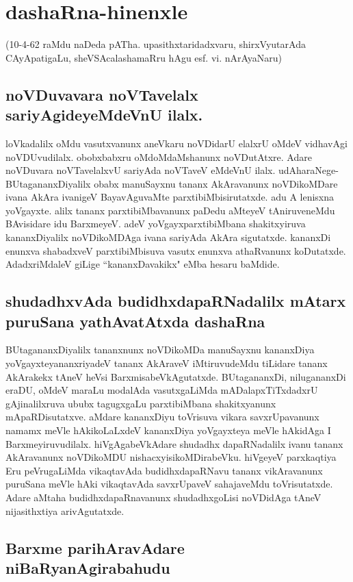 \chapter{dashaRna-hinenxle}

(10-4-62 raMdu naDeda pATha. upasithxtaridadxvaru, shirxVyutarAda CAyApatigaLu, sheVSAcalashamaRru hAgu esf. vi. nArAyaNaru)

\section*{noVDuvavara noVTavelalx sariyAgideyeMdeVnU ilalx.}

loVkadalilx oMdu vasutxvanunx aneVkaru noVDidarU elalxrU oMdeV vidhavAgi noVDUvudilalx. obobxbabxru oMdoMdaMshanunx noVDutAtxre. Adare noVDuvara noVTavelalxvU sariyAda noVTaveV eMdeVnU ilalx. udAharaNege-BUtagananxDiyalilx obabx manuSayxnu tananx AkAravanunx noVDikoMDare ivana AkAra ivanigeV BayavAguvaMte parxtibiMbisirutatxde. adu A lenisxna yoVgayxte. alilx tananx parxtibiMbavanunx paDedu aMteyeV tAniruveneMdu BAvisidare idu BarxmeyeV. adeV yoVgayxparxtibiMbana shakitxyiruva kananxDiyalilx noVDikoMDAga ivana sariyAda AkAra sigutatxde. kananxDi enunxva shabadxveV parxtibiMbisuva vasutx enunxva athaRvanunx koDutatxde. AdadxriMdaleV giLige ``kananxDavakikx" eMba hesaru baMdide.

\section*{shudadhxvAda budidhxdapaRNadalilx mAtarx puruSana yathAvatAtxda dashaRna}

BUtagananxDiyalilx tananxnunx noVDikoMDa manuSayxnu kananxDiya yoVgayxteyananxriyadeV tananx AkAraveV iMtiruvudeMdu tiLidare tananx AkArakekx tAneV heVsi BarxmisabeVkAgutatxde. BUtagananxDi, nilugananxDi eraDU, oMdeV maraLu modalAda vasutxgaLiMda mADalapxTiTxdadxrU gAjinalilxruva ububx tagugxgaLu parxtibiMbana shakitxyanunx mApaRDisutatxve. aMdare kananxDiyu toVrisuva vikara savxrUpavanunx namamx meVle hAkikoLaLxdeV kananxDiya yoVgayxteya meVle hAkidAga I Barxmeyiruvudilalx. hiVgAgabeVkAdare shudadhx dapaRNadalilx ivanu tananx AkAravanunx noVDikoMDU nishacxyisikoMDirabeVku. hiVgeyeV parxkaqtiya Eru peVrugaLiMda vikaqtavAda budidhxdapaRNavu tananx vikAravanunx puruSana meVle hAki vikaqtavAda savxrUpaveV sahajaveMdu toVrisutatxde. Adare aMtaha budidhxdapaRnavanunx shudadhxgoLisi noVDidAga tAneV nijasithxtiya arivAgutatxde.

\section*{Barxme parihAravAdare niBaRyanAgirabahudu}

